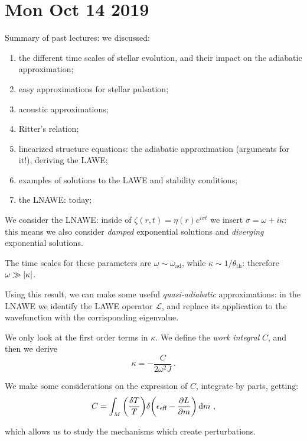 \documentclass[main.tex]{subfiles}
\begin{document}
\section*{Mon Oct 14 2019}

Summary of past lectures: we discussed:

\begin{enumerate}
    \item the different time scales of stellar evolution, and their impact on the adiabatic approximation;
    \item easy approximations for stellar pulsation;
    \item acoustic approximations;
    \item Ritter's relation;
    \item linearized structure equations: the adiabatic approximation (arguments for it!), deriving the LAWE;
    \item examples of solutions to the LAWE and stability conditions;
    \item the LNAWE: today;
\end{enumerate}

We consider the LNAWE: inside of \(\zeta (r, t) = \eta (r) e^{i \sigma t}\) we insert \(\sigma = \omega + i \kappa \): this means we also consider \emph{damped} exponential solutions and \emph{diverging} exponential solutions.

The time scales for these parameters are \(\omega \sim \omega _{\text{ad}}\), while \(\kappa \sim 1/ \theta _{\text{th}}\): therefore \(\omega \gg \abs{\kappa } \).

Using this result, we can make some useful \emph{quasi-adiabatic} approximations: in the LNAWE we identify the LAWE operator \(\mathcal{L}\), and replace its application to the wavefunction with the corrisponding eigenvalue.

We only look at the first order terms in \(\kappa \).
We define the \emph{work integral} \(C\), and then we derive 
%
\begin{equation}
  \kappa = - \frac{C}{2 \omega^2 J }
\,.
\end{equation}

We make some considerations on the expression of \(C\), integrate by parts, getting:
%
\begin{equation}
  C = \int_M \qty(\frac{\delta T}{T}) \delta \qty(\epsilon _{\text{eff}}- \pdv{L}{m} ) \dd{m}
\,,
\end{equation}

which allows us to study the mechanisms which create perturbations.
\end{document}
